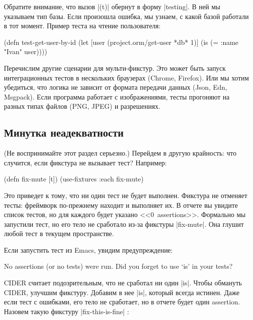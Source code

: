 Обратите внимание, что вызов \spverb|(t)| обернут в форму \spverb|testing|. В
ней мы указываем тип базы. Если произошла ошибка, мы узнаем, с какой базой
работали в тот момент. Пример теста на чтение пользователя:

\begin{english}
  \begin{clojure}
(defn test-get-user-by-id
  (let [user (project.orm/get-user *db* 1)]
    (is (= {:name "Ivan"} user))))
  \end{clojure}
\end{english}

Перечислим другие сценарии для мульти-фикстур. Это может быть запуск
интеграционных тестов в нескольких браузерах (Chrome, Firefox). Или мы хотим
убедиться, что логика не зависит от формата передачи данных (Json, Edn,
Msgpack). Если программа работает с изображениями, тесты прогоняют на разных
типах файлов (PNG, JPEG) и разрешениях.

\subsection{Минутка неадекватности}

(Не воспринимайте этот раздел серьезно.) Перейдем в другую крайность: что
случится, если фикстура не вызывает тест? Например:

\begin{english}
  \begin{clojure}
(defn fix-mute [t])
(use-fixtures :each fix-mute)
  \end{clojure}
\end{english}

Это приведет к тому, что ни один тест не будет выполнен. Фикстура не отменяет
тесты: фреймворк по-прежнему находит и выполняет их. В отчете вы увидите список
тестов, но для каждого будет указано <<0~assertions>>. Формально мы запустили
тест, но его тело не сработало из-за фикстуры \spverb|fix-mute|. Она глушит
любой тест в текущем пространстве.

Если запустить тест из Emacs, увидим предупреждение:

\begin{english}
  \begin{clojure}
No assertions (or no tests) were run.
Did you forget to use ‘is’ in your tests?
  \end{clojure}
\end{english}

CIDER считает подозрительным, что не сработал ни один \spverb|is|. Чтобы
обмануть CIDER, улучшим фикстуру. Добавим в нее \spverb|is|, который всегда
истинен. Даже если тест с ошибками, его тело не сработает, но в отчете будет
один assertion. Назовем такую фикстуру \spverb|fix-this-is-fine|%
:

